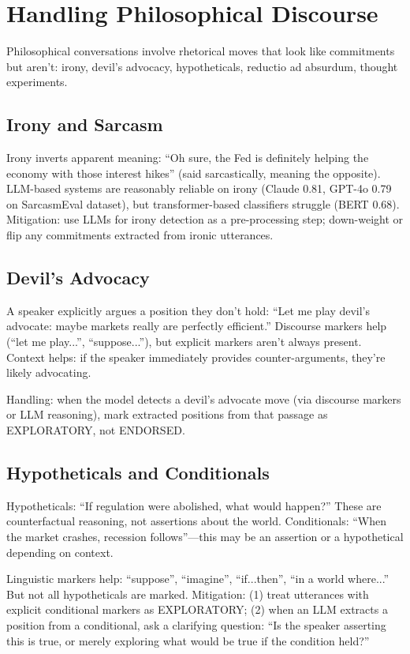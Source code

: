 \documentclass[11pt,letterpaper]{article}
\begin{document}
\section{Handling Philosophical Discourse}

Philosophical conversations involve rhetorical moves that look like commitments but aren't: irony, devil's advocacy, hypotheticals, reductio ad absurdum, thought experiments.

\subsection{Irony and Sarcasm}

Irony inverts apparent meaning: ``Oh sure, the Fed is definitely helping the economy with those interest hikes'' (said sarcastically, meaning the opposite). LLM-based systems are reasonably reliable on irony (Claude 0.81, GPT-4o 0.79 on SarcasmEval dataset), but transformer-based classifiers struggle (BERT 0.68). Mitigation: use LLMs for irony detection as a pre-processing step; down-weight or flip any commitments extracted from ironic utterances.

\subsection{Devil's Advocacy}

A speaker explicitly argues a position they don't hold: ``Let me play devil's advocate: maybe markets really are perfectly efficient.'' Discourse markers help (``let me play...'', ``suppose...''), but explicit markers aren't always present. Context helps: if the speaker immediately provides counter-arguments, they're likely advocating.

Handling: when the model detects a devil's advocate move (via discourse markers or LLM reasoning), mark extracted positions from that passage as EXPLORATORY, not ENDORSED.

\subsection{Hypotheticals and Conditionals}

Hypotheticals: ``If regulation were abolished, what would happen?'' These are counterfactual reasoning, not assertions about the world. Conditionals: ``When the market crashes, recession follows''—this may be an assertion or a hypothetical depending on context.

Linguistic markers help: ``suppose'', ``imagine'', ``if...then'', ``in a world where...'' But not all hypotheticals are marked. Mitigation: (1) treat utterances with explicit conditional markers as EXPLORATORY; (2) when an LLM extracts a position from a conditional, ask a clarifying question: ``Is the speaker asserting this is true, or merely exploring what would be true if the condition held?''
\end{document}
